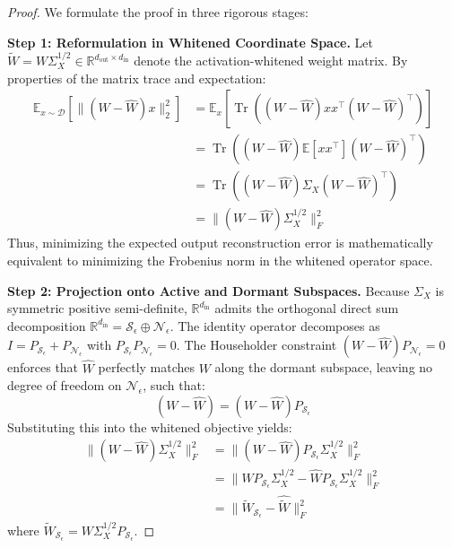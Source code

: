 \documentclass{article}
\begin{document}
\begin{proof}
We formulate the proof in three rigorous stages:

\textbf{Step 1: Reformulation in Whitened Coordinate Space.}
Let $\tilde{W} = W \Sigma_X^{1/2} \in \mathbb{R}^{d_{\text{out}} \times d_{\text{in}}}$ denote the activation-whitened weight matrix. By properties of the matrix trace and expectation:
\begin{align}
    \mathbb{E}_{x \sim \mathcal{D}}\left[ \|(W - \hat{W}) x\|_2^2 \right] &= \mathbb{E}_x \left[ \operatorname{Tr}\left( (W - \hat{W}) x x^\top (W - \hat{W})^\top \right) \right] \nonumber \\
    &= \operatorname{Tr}\left( (W - \hat{W}) \mathbb{E}[x x^\top] (W - \hat{W})^\top \right) \nonumber \\
    &= \operatorname{Tr}\left( (W - \hat{W}) \Sigma_X (W - \hat{W})^\top \right) \nonumber \\
    &= \| (W - \hat{W}) \Sigma_X^{1/2} \|_F^2
\end{align}
Thus, minimizing the expected output reconstruction error is mathematically equivalent to minimizing the Frobenius norm in the whitened operator space.

\textbf{Step 2: Projection onto Active and Dormant Subspaces.}
Because $\Sigma_X$ is symmetric positive semi-definite, $\mathbb{R}^{d_{\text{in}}}$ admits the orthogonal direct sum decomposition $\mathbb{R}^{d_{\text{in}}} = \mathcal{S}_\epsilon \oplus \mathcal{N}_\epsilon$. The identity operator decomposes as $I = P_{\mathcal{S}_\epsilon} + P_{\mathcal{N}_\epsilon}$ with $P_{\mathcal{S}_\epsilon} P_{\mathcal{N}_\epsilon} = 0$. 
The Householder constraint $(W - \hat{W}) P_{\mathcal{N}_\epsilon} = 0$ enforces that $\hat{W}$ perfectly matches $W$ along the dormant subspace, leaving no degree of freedom on $\mathcal{N}_\epsilon$, such that:
\begin{equation}
    (W - \hat{W}) = (W - \hat{W}) P_{\mathcal{S}_\epsilon}
\end{equation}
Substituting this into the whitened objective yields:
\begin{align}
    \| (W - \hat{W}) \Sigma_X^{1/2} \|_F^2 &= \| (W - \hat{W}) P_{\mathcal{S}_\epsilon} \Sigma_X^{1/2} \|_F^2 \nonumber \\
    &= \| W P_{\mathcal{S}_\epsilon} \Sigma_X^{1/2} - \hat{W} P_{\mathcal{S}_\epsilon} \Sigma_X^{1/2} \|_F^2 \nonumber \\
    &= \| \tilde{W}_{\mathcal{S}_\epsilon} - \hat{\tilde{W}} \|_F^2
\end{align}
where $\tilde{W}_{\mathcal{S}_\epsilon} = W \Sigma_X^{1/2} P_{\mathcal{S}_\epsilon}$.


\end{proof}
\end{document}
